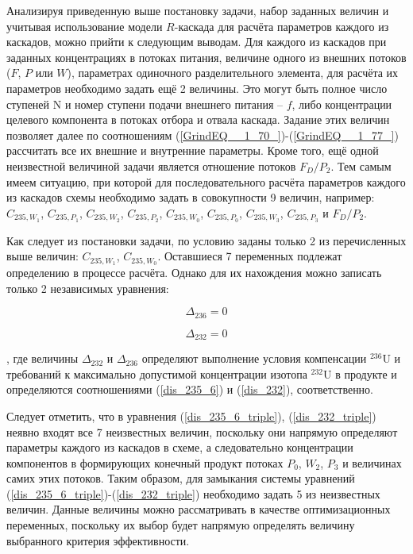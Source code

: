 {Анализируя приведенную выше постановку задачи, набор заданных величин и учитывая использование модели $R$-каскада для расчёта параметров каждого из каскадов, можно прийти к следующим выводам. Для каждого из каскадов при заданных концентрациях в потоках питания, величине одного из внешних потоков ($F$, $P$ или $W$), параметрах одиночного разделительного элемента, для расчёта их параметров необходимо задать ещё 2 величины. Это могут быть полное число ступеней N и номер ступени подачи внешнего питания -- $f$, либо концентрации целевого компонента в потоках отбора и отвала каскада. Задание этих величин позволяет далее по соотношениям (\ref{GrindEQ__1_70_})-(\ref{GrindEQ__1_77_}) рассчитать все их внешние и внутренние параметры. Кроме того, ещё одной неизвестной величиной задачи является отношение потоков ${F_{D}}/{P_2}$.  Тем самым имеем ситуацию, при которой для последовательного расчёта параметров каждого из каскадов схемы необходимо задать в совокупности 9 величин, например: $C_{235,{W_1}}$, $C_{235,{P_1}}$, $C_{235,{W_2}}$, $C_{235,{P_2}}$, $C_{235,{W_0}}$, $C_{235,{P_0}}$, $C_{235,{W_3}}$, $C_{235,{P_3}}$ и ${F_{D}}/{P_2}$. 

Как следует из постановки задачи, по условию заданы только 2 из перечисленных выше величин: $C_{235,{W_1}}$, $C_{235,{W_0}}$. Оставшиеся 7 переменных подлежат определению в процессе расчёта. Однако для их нахождения можно записать только 2 независимых уравнения:

\begin{equation}
    \label{dis_235_6_triple}
    \Delta_{236}=0
\end{equation}

\begin{equation}
    \label{dis_232_triple}
    \Delta_{232}=0
\end{equation}

, где величины $\Delta_{232}$ и $\Delta_{236}$ определяют выполнение условия компенсации $^{236}$U и требований к максимально допустимой концентрации изотопа $^{232}$U в продукте и определяются соотношениями (\ref{dis_235_6}) и (\ref{dis_232}), соответственно.

Следует отметить, что в уравнения (\ref{dis_235_6_triple}), (\ref{dis_232_triple}) неявно входят все 7 неизвестных величин, поскольку они напрямую определяют параметры каждого из каскадов в схеме, а следовательно концентрации компонентов в формирующих конечный продукт потоках $P_0$, $W_2$, $P_3$ и величинах самих этих потоков. Таким образом, для замыкания системы уравнений (\ref{dis_235_6_triple})-(\ref{dis_232_triple}) необходимо задать 5 из неизвестных величин. Данные величины можно рассматривать в качестве оптимизационных переменных, поскольку их выбор будет напрямую определять величину выбранного критерия эффективности.


}
